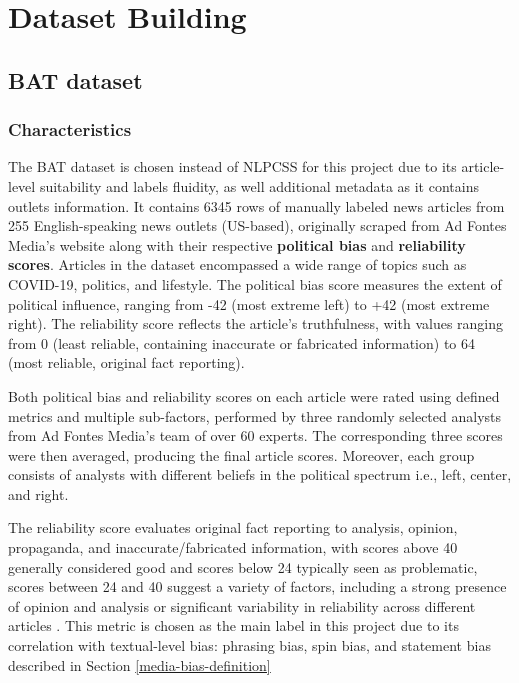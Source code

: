 \chapter{Dataset Building}
\label{cha:4}

\section{BAT dataset}

\subsection{Characteristics} \label{bat-characteristics}

The BAT dataset \cite{spinde-2023-bat} is chosen instead of NLPCSS \cite{chen-2020-nlpcss} for this project due to its article-level suitability and labels fluidity, as well additional metadata as it contains outlets information. It contains 6345 rows of manually labeled news articles from 255 English-speaking news outlets (US-based), originally scraped from Ad Fontes Media's website along with their respective \textbf{political bias} and \textbf{reliability scores}. Articles in the dataset encompassed a wide range of topics such as COVID-19, politics, and lifestyle. The political bias score measures the extent of political influence, ranging from -42 (most extreme left) to +42 (most extreme right). The reliability score reflects the article's truthfulness, with values ranging from 0 (least reliable, containing inaccurate or fabricated information) to 64 (most reliable, original fact reporting).

Both political bias and reliability scores on each article were rated using defined metrics and multiple sub-factors, performed by three randomly selected analysts from Ad Fontes Media's team of over 60 experts. The corresponding three scores were then averaged, producing the final article scores. Moreover, each group consists of analysts with different beliefs in the political spectrum i.e., left, center, and right.

The reliability score evaluates original fact reporting to analysis, opinion, propaganda, and inaccurate/fabricated information, with scores above 40 generally considered good and scores below 24 typically seen as problematic, scores between 24 and 40 suggest a variety of factors, including a strong presence of opinion and analysis or significant variability in reliability across different articles \cite{adfontes}. This metric is chosen as the main label in this project due to its correlation with textual-level bias: phrasing bias, spin bias, and statement bias described in Section \ref{media-bias-definition}

